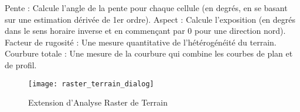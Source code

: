 Pente : Calcule l'angle de la pente pour chaque cellule (en degrés, en se basant sur une estimation dérivée de 1er ordre).
Aspect : Calcule l'exposition (en degrés dans le sens horaire inverse et en commençant par 0 pour une direction nord).
Facteur de rugosité : Une mesure quantitative de l'hétérogénéité du terrain.
Courbure totale : Une mesure de la courbure qui combine les courbes de plan et de profil.

\begin{figure}[ht]
   \begin{center}
   \caption{Extension d'Analyse Raster de Terrain \nixcaption}\label{fig:raster_terrain_dialog}\smallskip
   \texttt{[image: raster\_terrain\_dialog]}
\end{center}  
\end{figure}

\label{raster_terrain_usage}

